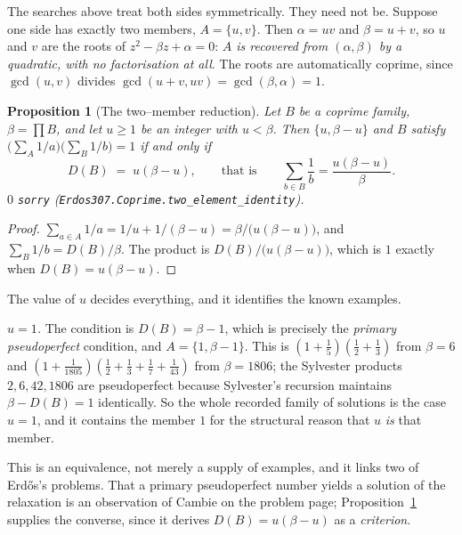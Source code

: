 \documentclass[11pt]{article}
\newtheorem{proposition}[theorem]{Proposition}
\theoremstyle{definition}
\begin{document}
The searches above treat both sides symmetrically. They need not be. Suppose one side has exactly
two members, $A=\{u,v\}$. Then $\alpha=uv$ and $\beta=u+v$, so $u$ and $v$ are the roots of
$z^2-\beta z+\alpha=0$: \emph{$A$ is recovered from $(\alpha,\beta)$ by a quadratic, with no
factorisation at all}. The roots are automatically coprime, since $\gcd(u,v)$ divides
$\gcd(u+v,uv)=\gcd(\beta,\alpha)=1$.

\begin{proposition}[The two--member reduction]\label{prop:twoside}
Let $B$ be a coprime family, $\beta=\prod B$, and let $u\ge1$ be an integer with $u<\beta$. Then
$\{u,\beta-u\}$ and $B$ satisfy $\bigl(\sum_A1/a\bigr)\bigl(\sum_B1/b\bigr)=1$ if and only if
\[ D(B)\;=\;u(\beta-u),\qquad\text{that is}\qquad \sum_{b\in B}\frac1b=\frac{u(\beta-u)}{\beta}. \]
$0$ \texttt{sorry} \textup{(\texttt{Erdos307.Coprime.two\_element\_identity})}.
\end{proposition}
\begin{proof}
$\sum_{a\in A}1/a=1/u+1/(\beta-u)=\beta/\bigl(u(\beta-u)\bigr)$, and $\sum_B1/b=D(B)/\beta$. The
product is $D(B)/\bigl(u(\beta-u)\bigr)$, which is $1$ exactly when $D(B)=u(\beta-u)$.
\end{proof}

The value of $u$ decides everything, and it identifies the known examples.

\emph{$u=1$.} The condition is $D(B)=\beta-1$, which is precisely the \emph{primary pseudoperfect}
condition, and $A=\{1,\beta-1\}$. This is $(1+\frac15)(\frac12+\frac13)$ from $\beta=6$ and
$(1+\frac1{1805})(\frac12+\frac13+\frac17+\frac1{43})$ from $\beta=1806$; the Sylvester products
$2,6,42,1806$ are pseudoperfect because Sylvester's recursion maintains $\beta-D(B)=1$ identically.
So the whole recorded family of solutions is the case $u=1$, and it contains the member $1$ for the
structural reason that $u$ \emph{is} that member.

This is an equivalence, not merely a supply of examples, and it links two of Erd\H{o}s's problems.
That a primary pseudoperfect number yields a solution of the relaxation is an observation of Cambie
on the problem page; Proposition~\ref{prop:twoside} supplies the converse, since it derives
$D(B)=u(\beta-u)$ as a \emph{criterion}.
\end{document}
